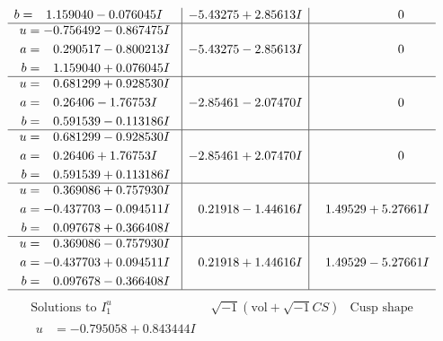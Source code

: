 \documentclass[1p]{elsarticle_modified}
\theoremstyle{definition}
\newcommand{\I}{\sqrt{-1}}
\begin{document}
$$\begin{array}{c|c|c}
\begin{aligned}
b &= \phantom{-}1.159040 - 0.076045 I\end{aligned}
 & -5.43275 + 2.85613 I & \phantom{-0.000000 } 0 \\ \hline\begin{aligned}
u &= -0.756492 - 0.867475 I \\
a &= \phantom{-}0.290517 - 0.800213 I \\
b &= \phantom{-}1.159040 + 0.076045 I\end{aligned}
 & -5.43275 - 2.85613 I & \phantom{-0.000000 } 0 \\ \hline\begin{aligned}
u &= \phantom{-}0.681299 + 0.928530 I \\
a &= \phantom{-}0.26406 - 1.76753 I \\
b &= \phantom{-}0.591539 - 0.113186 I\end{aligned}
 & -2.85461 - 2.07470 I & \phantom{-0.000000 } 0 \\ \hline\begin{aligned}
u &= \phantom{-}0.681299 - 0.928530 I \\
a &= \phantom{-}0.26406 + 1.76753 I \\
b &= \phantom{-}0.591539 + 0.113186 I\end{aligned}
 & -2.85461 + 2.07470 I & \phantom{-0.000000 } 0 \\ \hline\begin{aligned}
u &= \phantom{-}0.369086 + 0.757930 I \\
a &= -0.437703 - 0.094511 I \\
b &= \phantom{-}0.097678 + 0.366408 I\end{aligned}
 & \phantom{-}0.21918 - 1.44616 I & \phantom{-}1.49529 + 5.27661 I \\ \hline\begin{aligned}
u &= \phantom{-}0.369086 - 0.757930 I \\
a &= -0.437703 + 0.094511 I \\
b &= \phantom{-}0.097678 - 0.366408 I\end{aligned}
 & \phantom{-}0.21918 + 1.44616 I & \phantom{-}1.49529 - 5.27661 I\\
 \hline 
 \end{array}$$\newpage$$\begin{array}{c|c|c}  
\text{Solutions to }I^u_{1}& \I (\text{vol} + \sqrt{-1}CS) & \text{Cusp shape}\\
 \hline 
\begin{aligned}
u &= -0.795058 + 0.843444 I \\

\end{aligned}
\end{array}$$
\end{document}
